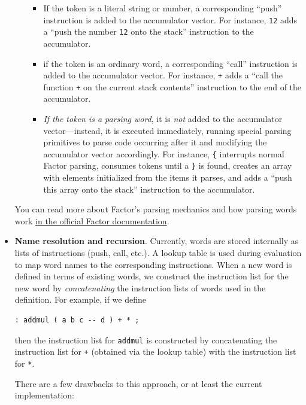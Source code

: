 \documentclass[
]{article}
\providecommand{\tightlist}{%
  \setlength{\itemsep}{0pt}\setlength{\parskip}{0pt}}
\begin{document}
\begin{itemize}
\begin{itemize}
    \begin{itemize}
    \tightlist
    \item
      If the token is a literal string or number, a corresponding
      ``push'' instruction is added to the accumulator vector. For
      instance, \texttt{12} adds a ``push the number \texttt{12} onto
      the stack'' instruction to the accumulator.
    \item
      if the token is an ordinary word, a corresponding ``call''
      instruction is added to the accumulator vector. For instance,
      \texttt{+} adds a ``call the function \texttt{+} on the current
      stack contents'' instruction to the end of the accumulator.
    \item
      \emph{If the token is a parsing word}, it is \emph{not} added to
      the accumulator vector---instead, it is executed immediately,
      running special parsing primitives to parse code occurring after
      it and modifying the accumulator vector accordingly. For instance,
      \texttt{\{} interrupts normal Factor parsing, consumes tokens
      until a \texttt{\}} is found, creates an array with elements
      initialized from the items it parses, and adds a ``push this array
      onto the stack'' instruction to the accumulator.
    \end{itemize}
  \end{itemize}

  You can read more about Factor's parsing mechanics and how parsing
  words work
  \href{https://docs.factorcode.org/content/article-parsing-words.html}{in
  the official Factor documentation}.
\item
  \textbf{Name resolution and recursion}. Currently, words are stored
  internally as lists of instructions (push, call, etc.). A lookup table
  is used during evaluation to map word names to the corresponding
  instructions. When a new word is defined in terms of existing words,
  we construct the instruction list for the new word by
  \emph{concatenating} the instruction lists of words used in the
  definition. For example, if we define

\begin{verbatim}
: addmul ( a b c -- d ) + * ;
\end{verbatim}

  then the instruction list for \texttt{addmul} is constructed by
  concatenating the instruction list for \texttt{+} (obtained via the
  lookup table) with the instruction list for \texttt{*}.

  There are a few drawbacks to this approach, or at least the current
  implementation:


\end{itemize}
\end{document}
